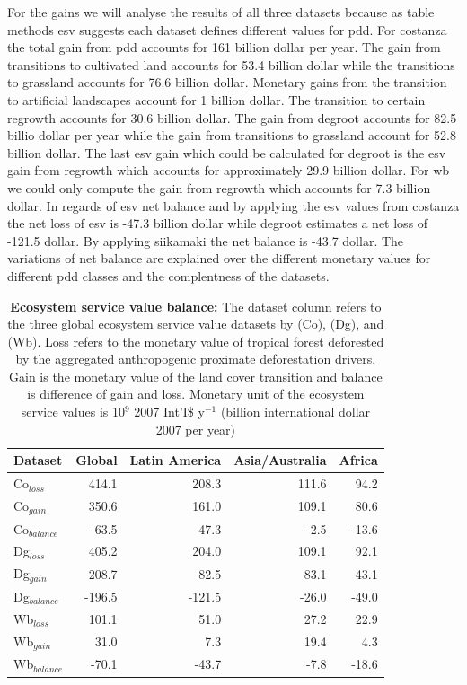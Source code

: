 For the gains we will analyse the results of all three datasets because as table methods esv suggests each dataset defines different values for pdd. For costanza the total gain from pdd accounts for 161 billion dollar per year. The gain from transitions to cultivated land accounts for 53.4 billion dollar while the transitions to grassland accounts for 76.6 billion dollar. Monetary gains from the transition to artificial landscapes account for 1 billion dollar. The transition to certain regrowth accounts for 30.6 billion dollar. The gain from degroot accounts for 82.5 billio dollar per year while the gain from transitions to grassland account for 52.8 billion dollar. The last esv gain which could be calculated for degroot is the esv gain from regrowth which accounts for approximately 29.9 billion dollar. For wb we could only compute the gain from regrowth which accounts for 7.3 billion dollar. In regards of esv net balance and by applying the esv values from costanza the net loss of esv is -47.3 billion dollar while degroot estimates a net loss of -121.5 dollar. By applying siikamaki the net balance is -43.7 dollar. The variations of net balance are explained over the different monetary values for different pdd classes and the complentness of the datasets.
		\begin{table}[ht]
			\centering
			\caption[Ecosystem service value balance]{\textbf{Ecosystem service value balance:} The dataset column refers to the three global ecosystem service value datasets by \citet{Groot2012} (Co), \citet{Costanza2014} (Dg), and \citet{Siikamaki2015} (Wb). Loss refers to the monetary value of tropical forest deforested by the aggregated anthropogenic proximate deforestation drivers. Gain is the monetary value of the land cover transition and balance is difference of gain and loss. Monetary unit of the ecosystem service values is 10$^{9}$ 2007 Int'I\$ y$^{-1}$ (billion international dollar 2007 per year)}
			\label{tab:esv_results}
			\begin{tabular}{lrrrr}
				\hline
				Dataset & Global & Latin America & Asia/Australia & Africa \\
				\hline
				Co$_{loss}$ & 414.1 & 208.3 & 111.6 & 94.2\\
				Co$_{gain}$ & 350.6 & 161.0 & 109.1 & 80.6\\
				Co$_{balance}$ & -63.5 & -47.3 & -2.5 & -13.6\\
				Dg$_{loss}$ & 405.2 & 204.0 & 109.1 & 92.1\\
				Dg$_{gain}$ & 208.7 & 82.5 & 83.1 & 43.1\\
				Dg$_{balance}$ & -196.5 & -121.5 & -26.0 & -49.0\\
				Wb$_{loss}$ & 101.1 & 51.0 & 27.2 & 22.9\\
				Wb$_{gain}$ & 31.0 & 7.3 & 19.4 & 4.3\\
				Wb$_{balance}$ & -70.1 & -43.7 & -7.8 & -18.6\\
				\hline
			\end{tabular}
		\end{table}

